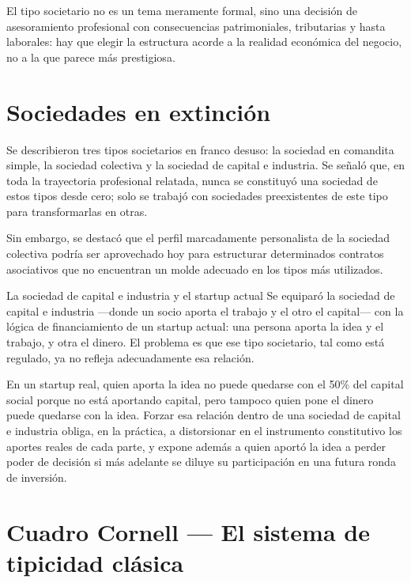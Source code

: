 \documentclass[12pt,oneside]{book}
\begin{document}
\begin{important}
El tipo societario no es un tema meramente formal, sino una decisión de asesoramiento profesional con consecuencias patrimoniales, tributarias y hasta laborales: hay que elegir la estructura acorde a la realidad económica del negocio, no a la que parece más prestigiosa.
\end{important}

\section{Sociedades en extinción}

Se describieron tres tipos societarios en franco desuso: la sociedad en comandita simple, la sociedad colectiva y la sociedad de capital e industria. Se señaló que, en toda la trayectoria profesional relatada, nunca se constituyó una sociedad de estos tipos desde cero; solo se trabajó con sociedades preexistentes de este tipo para transformarlas en otras.

Sin embargo, se destacó que el perfil marcadamente personalista de la sociedad colectiva podría ser aprovechado hoy para estructurar determinados contratos asociativos que no encuentran un molde adecuado en los tipos más utilizados.

\begin{example}{La sociedad de capital e industria y el startup actual}
Se equiparó la sociedad de capital e industria —donde un socio aporta el trabajo y el otro el capital— con la lógica de financiamiento de un startup actual: una persona aporta la idea y el trabajo, y otra el dinero. El problema es que ese tipo societario, tal como está regulado, ya no refleja adecuadamente esa relación.

En un startup real, quien aporta la idea no puede quedarse con el 50\% del capital social porque no está aportando capital, pero tampoco quien pone el dinero puede quedarse con la idea. Forzar esa relación dentro de una sociedad de capital e industria obliga, en la práctica, a distorsionar en el instrumento constitutivo los aportes reales de cada parte, y expone además a quien aportó la idea a perder poder de decisión si más adelante se diluye su participación en una futura ronda de inversión.
\end{example}

\section*{Cuadro Cornell — El sistema de tipicidad clásica}
\end{document}
